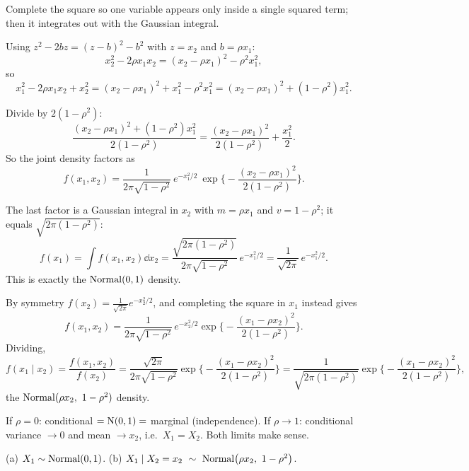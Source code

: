 \documentclass[11pt]{article}
\begin{document}
\begin{keyidea}
Complete the square so one variable appears only inside a single squared term; then it integrates out with the Gaussian integral.
\end{keyidea}

\solution
{}
Using $z^2-2bz=(z-b)^2-b^2$ with $z=x_2$ and $b=\rho x_1$:
\[
x_2^2-2\rho x_1x_2=(x_2-\rho x_1)^2-\rho^2x_1^2,
\]
so
\[
x_1^2-2\rho x_1x_2+x_2^2=(x_2-\rho x_1)^2+x_1^2-\rho^2x_1^2=(x_2-\rho x_1)^2+(1-\rho^2)x_1^2.
\]

Divide by $2(1-\rho^2)$:
\[
\frac{(x_2-\rho x_1)^2+(1-\rho^2)x_1^2}{2(1-\rho^2)}=\frac{(x_2-\rho x_1)^2}{2(1-\rho^2)}+\frac{x_1^2}{2}.
\]
So the joint density factors as
\[
f(x_1,x_2)=\frac{1}{2\pi\sqrt{1-\rho^2}}\ e^{-x_1^2/2}\ \exp\Big\{-\frac{(x_2-\rho x_1)^2}{2(1-\rho^2)}\Big\}.
\]

The last factor is a Gaussian integral in $x_2$ with $m=\rho x_1$ and $v=1-\rho^2$; it equals $\sqrt{2\pi(1-\rho^2)}$:
\[
f(x_1)=\int f(x_1,x_2)\dd x_2=\frac{\sqrt{2\pi(1-\rho^2)}}{2\pi\sqrt{1-\rho^2}}\,e^{-x_1^2/2}=\frac{1}{\sqrt{2\pi}}\,e^{-x_1^2/2}.
\]
This is exactly the $\mathrm{Normal}(0,1)$ density.

By symmetry $f(x_2)=\frac1{\sqrt{2\pi}}e^{-x_2^2/2}$, and completing the square in $x_1$ instead gives
\[
f(x_1,x_2)=\frac{1}{2\pi\sqrt{1-\rho^2}}\,e^{-x_2^2/2}\exp\Big\{-\frac{(x_1-\rho x_2)^2}{2(1-\rho^2)}\Big\}.
\]
Dividing,
\[
f(x_1\mid x_2)=\frac{f(x_1,x_2)}{f(x_2)}=\frac{\sqrt{2\pi}}{2\pi\sqrt{1-\rho^2}}\exp\Big\{-\frac{(x_1-\rho x_2)^2}{2(1-\rho^2)}\Big\}
=\frac{1}{\sqrt{2\pi(1-\rho^2)}}\exp\Big\{-\frac{(x_1-\rho x_2)^2}{2(1-\rho^2)}\Big\},
\]
the $\dist{Normal}(\rho x_2,\ 1-\rho^2)$ density.

\begin{sanity}
If $\rho=0$: conditional $=\mathrm{N}(0,1)=$ marginal (independence). If $\rho\to1$: conditional variance $\to0$ and mean $\to x_2$, i.e.\ $X_1=X_2$. Both limits make sense.
\end{sanity}

\begin{answer}
(a) $X_1\sim\mathrm{Normal}(0,1)$. \qquad (b) $X_1\mid X_2=x_2\ \sim\ \mathrm{Normal}\big(\rho x_2,\ 1-\rho^2\big)$.
\end{answer}
\end{document}
